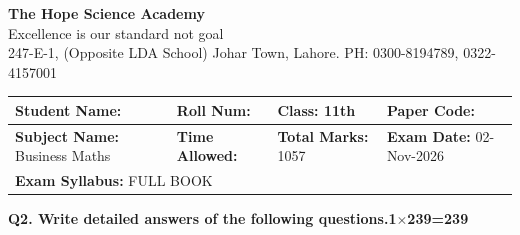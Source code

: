 \documentclass[11pt,a4paper]{article}
\begin{document}
\begin{center}
  {\Huge\bfseries The Hope Science Academy}\\[3pt]
  {\small Excellence is our standard not goal}\\[2pt]
  {\small 247-E-1, (Opposite LDA School) Johar Town, Lahore. PH: 0300-8194789, 0322-4157001}
\end{center}
\medskip\noindent
\begin{tabularx}{\linewidth}{|X|X|X|X|}
\hline
\textbf{Student Name:} & \textbf{Roll Num:} & \textbf{Class:} 11th & \textbf{Paper Code:} \\ \hline
\textbf{Subject Name:} Business Maths & \textbf{Time Allowed:} & \textbf{Total Marks:} 1057 & \textbf{Exam Date:} 02-Nov-2026 \\ \hline
\multicolumn{4}{|l|}{\textbf{Exam Syllabus:} FULL BOOK} \\ \hline
\end{tabularx}
\bigskip
\noindent\textbf{Q2. Write detailed answers of the following questions.}\hfill\textbf{1$\times$239=239}
\end{document}

